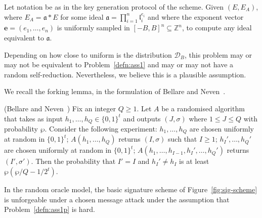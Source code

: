 \documentclass{llncs}
\newcommand{\D}{\mathcal{D}}
\newcommand{\Z}{\mathbb{Z}}
\renewcommand{\a}{\mathfrak{a}}
\renewcommand{\l}{\mathfrak{l}}
\newcommand{\e}{\mathbf{e}}
\begin{document}
\begin{problem} \label{defn:ass1p}
Let notation be as in the key generation protocol of the scheme.
Given $(E, E_A)$, where $E_A = \a * E$ for some ideal $\a = \prod_{i=1}^n \l_i^{e_i}$ and where the exponent vector $\e = (e_1, \dots, e_n)$ is uniformly sampled in $[-B,B]^n \subseteq \Z^n$, to compute any ideal equivalent to $\a$.
\end{problem}

Depending on how close to uniform is the distribution $\D_B$, this problem may or may not be equivalent to Problem~\ref{defn:ass1} and may or may not have a random self-reduction.
Nevertheless, we believe this is a plausible assumption.


We recall the forking lemma, in the formulation of Bellare and Neven~\cite{BN06}.

\begin{lemma} \label{forking-lemma} (Bellare and Neven~\cite{BN06})
Fix an integer $Q \ge 1$. Let $A$ be a randomised algorithm that takes as input $h_1, \dots, h_Q \in \{0,1\}^t$ and outputs $(J, \sigma)$ where $ 1\le J \le Q$ with probability $\wp$.
Consider the following experiment: $h_1, \dots, h_Q$ are chosen uniformly at random in $\{0,1\}^t$; $A(h_1, \dots, h_Q )$ returns $(I,\sigma)$ such that $I \ge 1$; $h_I', \dots, h_Q'$ are chosen uniformly at random in $\{0,1\}^t$; $A( h_1, \dots, h_{I-1}, h_I', \dots, h_Q' )$ returns $(I', \sigma')$.
Then the probability that $I' = I$ and $h_{I}' \ne h_I$ is at least $\wp( \wp/Q - 1/2^t )$.
\end{lemma}


\begin{theorem}\label{thm:security-basic}
In the random oracle model, the basic signature scheme of Figure~\ref{fig:sig-scheme} is unforgeable under a chosen message attack under the assumption that Problem~\ref{defn:ass1p} is hard.
\end{theorem}
\end{document}
